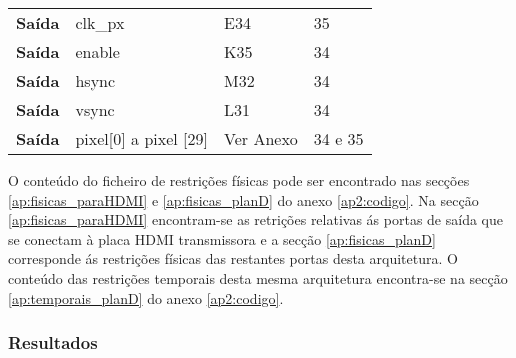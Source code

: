 \begin{table}[h!]
\begin{tabular}{rlll}
			\multicolumn{1}{r|}{\textbf{Saída}}   & clk\_px                            & E34                                      & 35                                         \\
			\multicolumn{1}{r|}{\textbf{Saída}}   & enable                             & K35                                      & 34                                         \\
			\multicolumn{1}{r|}{\textbf{Saída}}   & hsync                              & M32                                      & 34                                         \\
			\multicolumn{1}{r|}{\textbf{Saída}}   & vsync                              & L31                                      & 34                                         \\
			\multicolumn{1}{r|}{\textbf{Saída}}   & pixel{[}0{]} a pixel {[}29{]}      & Ver Anexo                                & 34 e 35                                    \\ \hline
		\end{tabular}%
\end{table}



O conteúdo do ficheiro de restrições físicas pode ser encontrado nas secções \ref{ap:fisicas_paraHDMI} e \ref{ap:fisicas_planD} do anexo \ref{ap2:codigo}. Na secção \ref{ap:fisicas_paraHDMI}  encontram-se as retrições relativas ás portas de saída que se conectam à placa HDMI transmissora e a secção \ref{ap:fisicas_planD} corresponde ás restrições físicas das restantes portas desta arquitetura. O conteúdo das restrições temporais desta mesma arquitetura encontra-se na secção \ref{ap:temporais_planD} do anexo \ref{ap2:codigo}.
%
%
\subsubsection{Resultados} \label{subsub:serial_planDresults}

